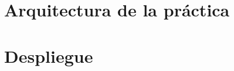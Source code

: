 \documentclass[a4paper,spanish,11pt]{article}
\begin{document}
\pagestyle{fancy}
\fancyfoot[C]{\thepage}
\renewcommand{\sectionmark}[1]{\markboth{\textbf{\thesection. #1}}{}}
\renewcommand*{\thepage}{\arabic{page}}
 \setcounter{page}{1}



\part{Arquitectura de la práctica}
\label{arquitectura}


\clearpage
\appendix %
\part{Despliegue}
\label{deploy}



 
\end{document}
